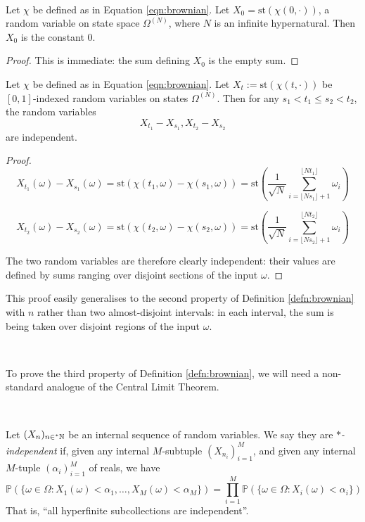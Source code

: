 \documentclass[11pt]{amsart}
\theoremstyle{remark}
\newcommand{\st}{\mathrm{st}}
\newcommand{\hyp}[1][\mathbb{R}]{\prescript{*}{}{#1}}
\begin{document}
\

\begin{thm} \label{thm:brownian1}
Let $\chi$ be defined as in Equation \ref{eqn:brownian}.
Let $X_0 = \st(\chi(0, \cdot))$, a random variable on state space $\Omega^{(N)}$, where $N$ is an infinite hypernatural.
Then $X_0$ is the constant $0$.
\end{thm}
\begin{proof}
This is immediate: the sum defining $X_0$ is the empty sum.
\end{proof}

\begin{thm} \label{thm:brownian2}
Let $\chi$ be defined as in Equation \ref{eqn:brownian}.
Let $X_t := \st(\chi(t, \cdot))$ be $[0,1]$-indexed random variables on states $\Omega^{(N)}$.
Then for any $s_1 < t_1 \leq s_2 < t_2$, the random variables $$X_{t_1} - X_{s_1}, X_{t_2} - X_{s_2}$$ are independent.
\end{thm}
\begin{proof}
$$X_{t_1}(\omega) - X_{s_1}(\omega) = \st( \chi(t_1, \omega) - \chi(s_1, \omega) ) = \st \left( \frac{1}{\sqrt{N}} \sum_{i=\lfloor N s_1 \rfloor + 1}^{\lfloor N t_1 \rfloor} \omega_i \right)$$

$$X_{t_2}(\omega) - X_{s_2}(\omega) = \st( \chi(t_2, \omega) - \chi(s_2, \omega) ) = \st \left( \frac{1}{\sqrt{N}} \sum_{i=\lfloor N s_2 \rfloor + 1}^{\lfloor N t_2 \rfloor} \omega_i \right)$$

The two random variables are therefore clearly independent: their values are defined by sums ranging over disjoint sections of the input $\omega$.
\end{proof}

This proof easily generalises to the second property of Definition \ref{defn:brownian} with $n$ rather than two almost-disjoint intervals: in each interval, the sum is being taken over disjoint regions of the input $\omega$.

\

To prove the third property of Definition \ref{defn:brownian}, we will need a non-standard analogue of the Central Limit Theorem.

\

\begin{defn} \label{defn:independence}
Let $(X_n)_{n \in \hyp[\mathbb{N}]}$ be an internal sequence of random variables.
We say they are \emph{$*$-independent} if, given any internal $M$-subtuple $(X_{n_i})_{i = 1}^M$, and given any internal $M$-tuple $(\alpha_i)_{i=1}^M$ of reals, we have $$\mathbb{P}\left( \{ \omega \in \Omega: X_1(\omega) < \alpha_1, \dots, X_M(\omega) < \alpha_M \} \right) = \prod_{i=1}^M \mathbb{P}( \{ \omega \in \Omega: X_i(\omega) < \alpha_i \} )$$ 
That is, ``all hyperfinite subcollections are independent''.
\end{defn}
\end{document}
